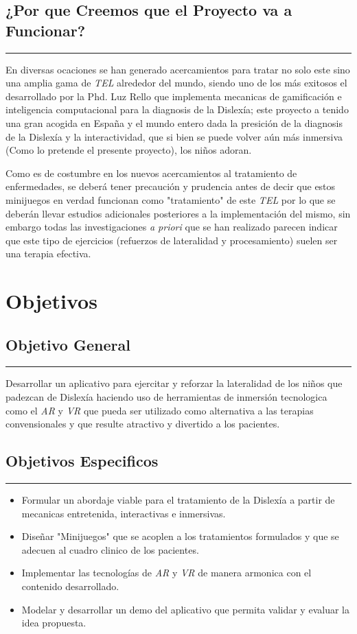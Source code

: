 \documentclass[12pt,letterpaper]{article}
\begin{document}
\subsection{¿Por que Creemos que el Proyecto va a Funcionar?}
\rule{150mm}{0.1mm} 
En diversas ocaciones se han generado acercamientos para tratar no solo este sino una amplia gama de \textit{TEL} alrededor del mundo, siendo uno de los más exitosos el desarrollado por la Phd. Luz Rello que implementa mecanicas de gamificación e inteligencia computacional para la diagnosis de la Dislexía; este proyecto a tenido una gran acogida en España y el mundo entero dada la presición de la diagnosis de la Dislexía y la interactividad, que si bien se puede volver aún más inmersiva (Como lo pretende el presente proyecto), los niños adoran.

Como es de costumbre en los nuevos acercamientos al tratamiento de enfermedades, se deberá tener precaución y prudencia antes de decir que estos minijuegos en verdad funcionan como "tratamiento" de este \textit{TEL} por lo que se deberán llevar estudios adicionales posteriores a la implementación del mismo, sin embargo todas las investigaciones \textit{a priori} que se han realizado parecen indicar que este tipo de ejercicios (refuerzos de lateralidad y procesamiento) suelen ser una terapia efectiva.

\section{Objetivos}
\subsection{Objetivo General}
\rule{150mm}{0.1mm} 
Desarrollar un aplicativo para ejercitar y reforzar la lateralidad de los niños que padezcan de Dislexía haciendo uso de herramientas de inmersión tecnologica como el \textit{AR} y \textit{VR} que pueda ser utilizado como alternativa a las terapias convensionales y que resulte atractivo y divertido a los pacientes.\\

\subsection{Objetivos Especificos}
\rule{150mm}{0.1mm} 
\begin{itemize}
\item Formular un abordaje viable para el tratamiento de la Dislexía a partir de mecanicas entretenida, interactivas e inmersivas.
\item Diseñar "Minijuegos" que se acoplen a los tratamientos formulados  y que se adecuen al cuadro clinico de los pacientes.
\item Implementar las tecnologías de \textit{AR} y  \textit{VR} de manera armonica con el contenido desarrollado.
\item Modelar y desarrollar un demo del aplicativo que permita validar y evaluar la idea propuesta.
\end{itemize}
\end{document}
